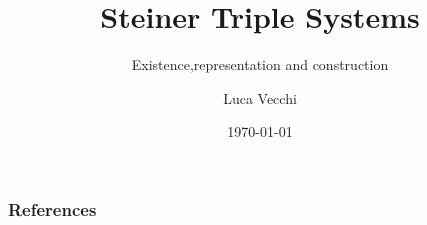 \documentclass{beamer}
\title{Steiner Triple Systems}
\subtitle{Existence,representation and construction}
\author{Luca Vecchi}
\institute{University of Milan}
\date{\today}
\begin{document}
	\begin{frame}
	\titlepage
	\end{frame}
	
	
	
	
	
	
	
	
\begin{comment}
	\begin{frame}
	\frametitle{Cyclic Steiner triple system}
	\end{frame}

	\begin{frame}
	\frametitle{STS $\Rightarrow$ Idempotent totally symmetric quasigroup construction}
	\end{frame}

	\begin{frame}
	\frametitle{Kirkamn triple systems}
	\end{frame}


	\begin{frame}
	\frametitle{Intersections of Steiner Triple Systems}
	Teirlink's Algorithm %
	\end{frame}
	\begin{frame}
	\frametitle{Embedding partial of Steiner Triple Systems}
	Teirlink's Algorithm %
	\end{frame}
\end{comment}

	\begin{frame}[t,allowframebreaks]
	\frametitle{References}
	\printbibliography
	\end{frame}
\end{document}
